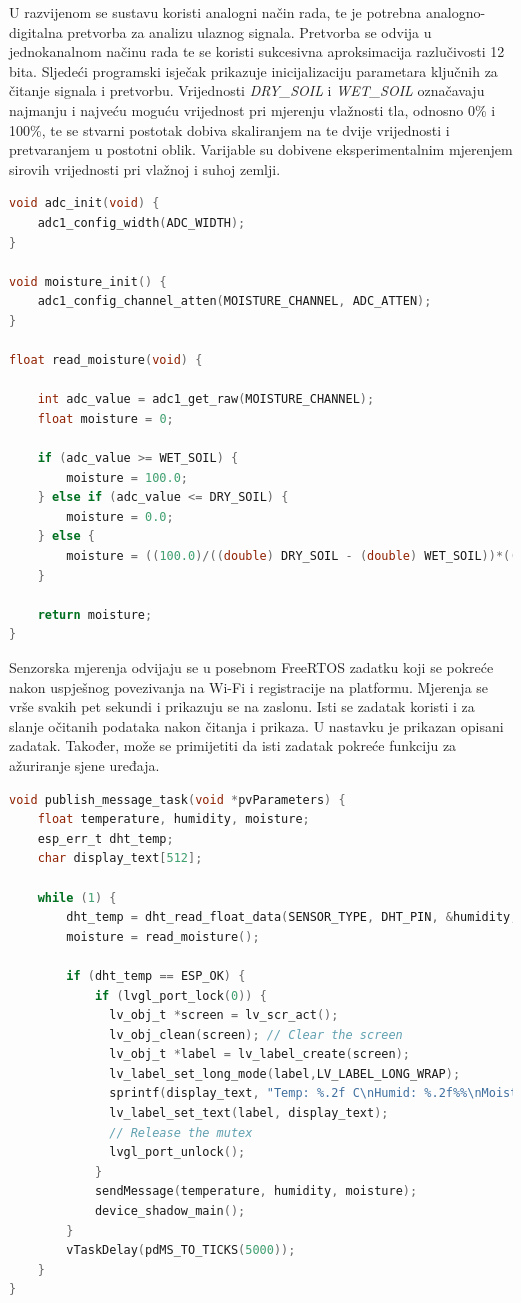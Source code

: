 U razvijenom se sustavu koristi analogni način rada, te je potrebna analogno-digitalna pretvorba za analizu ulaznog signala. Pretvorba se odvija u jednokanalnom načinu rada te se koristi sukcesivna aproksimacija razlučivosti 12 bita. Sljedeći programski isječak prikazuje inicijalizaciju parametara ključnih za čitanje signala i pretvorbu. Vrijednosti \textit{DRY\_SOIL} i \textit{WET\_SOIL} označavaju najmanju i najveću moguću vrijednost pri mjerenju vlažnosti tla, odnosno 0\% i 100\%, te se stvarni postotak dobiva skaliranjem na te dvije vrijednosti i pretvaranjem u postotni oblik. Varijable su dobivene eksperimentalnim mjerenjem sirovih vrijednosti pri vlažnoj i suhoj zemlji. 

\begin{lstlisting}[caption={}, language=c]
void adc_init(void) {
	adc1_config_width(ADC_WIDTH);
}

void moisture_init() {
	adc1_config_channel_atten(MOISTURE_CHANNEL, ADC_ATTEN);
}

float read_moisture(void) {
	
	int adc_value = adc1_get_raw(MOISTURE_CHANNEL);
	float moisture = 0;
	
	if (adc_value >= WET_SOIL) {
		moisture = 100.0;
	} else if (adc_value <= DRY_SOIL) {
		moisture = 0.0;
	} else {
		moisture = ((100.0)/((double) DRY_SOIL - (double) WET_SOIL))*((double) (adc_value) - (double) WET_SOIL);
	}
	
	return moisture;
}
\end{lstlisting}

Senzorska mjerenja odvijaju se u posebnom FreeRTOS zadatku koji se pokreće nakon uspješnog povezivanja na Wi-Fi i registracije na platformu. Mjerenja se vrše svakih pet sekundi i prikazuju se na zaslonu. Isti se zadatak koristi i za slanje očitanih podataka nakon čitanja i prikaza. U nastavku je prikazan opisani zadatak. Također, može se primijetiti da isti zadatak pokreće funkciju za ažuriranje sjene uređaja. 

\begin{lstlisting}[caption={FreeRTOS zadatak za očitanje senzorskih mjerenja i slanje podataka}, language=c]
void publish_message_task(void *pvParameters) {
	float temperature, humidity, moisture;
	esp_err_t dht_temp;
	char display_text[512];
	
	while (1) {
		dht_temp = dht_read_float_data(SENSOR_TYPE, DHT_PIN, &humidity, &temperature) != ESP_OK;
		moisture = read_moisture();
		
		if (dht_temp == ESP_OK) {
			if (lvgl_port_lock(0)) {
			  lv_obj_t *screen = lv_scr_act();
			  lv_obj_clean(screen); // Clear the screen
			  lv_obj_t *label = lv_label_create(screen);
			  lv_label_set_long_mode(label,LV_LABEL_LONG_WRAP);
			  sprintf(display_text, "Temp: %.2f C\nHumid: %.2f%%\nMoist: %.2f%%", temperature, humidity, moisture);
			  lv_label_set_text(label, display_text);
			  // Release the mutex
			  lvgl_port_unlock();
			}
			sendMessage(temperature, humidity, moisture);
			device_shadow_main();
		}
		vTaskDelay(pdMS_TO_TICKS(5000));
	}
}
\end{lstlisting}

